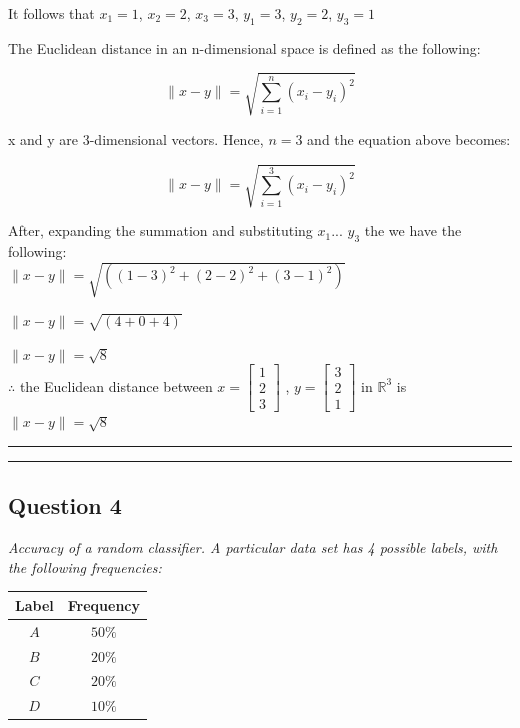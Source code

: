 \documentclass{article}
\begin{document}
   It follows that $x_1 = 1$, $x_2 = 2$, $x_3 = 3$, $y_1 = 3$, $y_2 = 2$, $y_3 = 1$

   The Euclidean distance in an n-dimensional space is defined as the following:

   $$\|x-y\| = \sqrt{\sum_{i=1}^{n} (x_i - y_i)^2}$$

   x and y are 3-dimensional vectors. Hence, $n=3$ and the equation above becomes:

   $$\|x-y\| = \sqrt{\sum_{i=1}^{3} (x_i - y_i)^2}$$

   After, expanding the summation and substituting $x_1$... $y_3$ the we have the following:\\

   $\|x-y\| = \sqrt{\left((1 - 3)^2+(2 - 2)^2+(3 - 1)^2\right)}$
   
   $\|x-y\| = \sqrt{\left(4+0+4\right)}$
   
   $\|x-y\| = \sqrt{8}$\\

   $\therefore$ the Euclidean distance between $x = \begin{bmatrix} 1 \\ 2 \\ 3 \end{bmatrix}$ , $y = \begin{bmatrix} 3 \\ 2 \\ 1 \end{bmatrix}$ in $\mathbb{R}^3$ is $\|x-y\| = \sqrt{8}$\\

\noindent\rule{\textwidth}{0.4pt}

\noindent\rule{\textwidth}{0.4pt}
\newpage
\subsection*{Question 4}

\textit{Accuracy of a random classifier. A particular data set has 4 possible labels, with the following frequencies:}
   
\begin{center}
\begin{tabular}{|c|c|}
\hline
Label & Frequency \\
\hline
$A$ & $50\%$ \\
$B$ & $20\%$ \\
$C$ & $20\%$ \\
$D$ & $10\%$ \\
\hline
\end{tabular}
\end{center}
\end{document}
